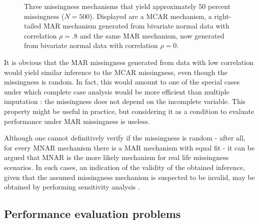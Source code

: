 \documentclass[bimj,fleqn]{w-art}
\theoremstyle{plain}
\theoremstyle{definition}
\begin{document}
\begin{figure}[htb]
\begin{center}
\caption{Three missingness mechanisms that yield approximately 50 percent missingness ($N=500$). Displayed are a MCAR mechanism, a right-tailed MAR mechanism generated from bivariate normal data with correlation $\rho=.8$ and the same MAR mechanism, now generated from bivariate normal data with correlation $\rho= 0$.}
\end{center}
\label{fig:MAR}
\end{figure}
\vspace*{1pc}

It is obvious that the MAR missingness generated from data with low correlation would yield similar inference to the MCAR missingness, even though the missingness is random. In fact, this would amount to one of the special cases under which complete case analysis would be more efficient than multiple imputation \citep[see e.g.][p. 48]{fimd}: the missingness does not depend on the incomplete variable. This property might be useful in practice, but considering it as a condition to evaluate performance under MAR missingness is useless. 

Although one cannot definitively verify if the missingness is random - after all, for every MNAR mechanism there is a MAR mechanism with equal fit \citep{molenberghs2008every} - it can be argued that MNAR is the more likely mechanism for real life missingness scenarios. In such cases, an indication of the validity of the obtained inference, given that the assumed missingness mechanism is suspected to be invalid, may be obtained by performing sensitivity analysis \citep[see e.g.][part 5]{molenberghs2014handbook}.


\subsection{Performance evaluation problems}
\end{document}
